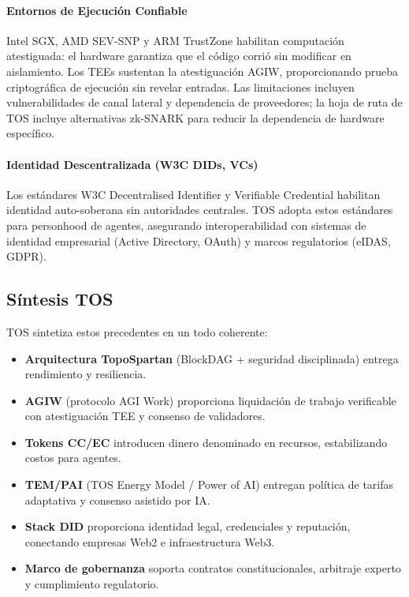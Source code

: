 \documentclass[11pt]{article}
\begin{document}
\paragraph{Entornos de Ejecución Confiable} Intel SGX, AMD SEV-SNP y ARM TrustZone habilitan computación atestiguada: el hardware garantiza que el código corrió sin modificar en aislamiento. Los TEEs sustentan la atestiguación AGIW, proporcionando prueba criptográfica de ejecución sin revelar entradas. Las limitaciones incluyen vulnerabilidades de canal lateral y dependencia de proveedores; la hoja de ruta de TOS incluye alternativas zk-SNARK para reducir la dependencia de hardware específico.

\paragraph{Identidad Descentralizada (W3C DIDs, VCs)} Los estándares W3C Decentralised Identifier y Verifiable Credential habilitan identidad auto-soberana sin autoridades centrales. TOS adopta estos estándares para personhood de agentes, asegurando interoperabilidad con sistemas de identidad empresarial (Active Directory, OAuth) y marcos regulatorios (eIDAS, GDPR).

\subsection{Síntesis TOS}
TOS sintetiza estos precedentes en un todo coherente:
\begin{itemize}[noitemsep]
  \item \textbf{Arquitectura TopoSpartan} (BlockDAG + seguridad disciplinada) entrega rendimiento y resiliencia.
  \item \textbf{AGIW} (protocolo AGI Work) proporciona liquidación de trabajo verificable con atestiguación TEE y consenso de validadores.
  \item \textbf{Tokens CC/EC} introducen dinero denominado en recursos, estabilizando costos para agentes.
  \item \textbf{TEM/PAI} (TOS Energy Model / Power of AI) entregan política de tarifas adaptativa y consenso asistido por IA.
  \item \textbf{Stack DID} proporciona identidad legal, credenciales y reputación, conectando empresas Web2 e infraestructura Web3.
  \item \textbf{Marco de gobernanza} soporta contratos constitucionales, arbitraje experto y cumplimiento regulatorio.
\end{itemize}
\end{document}
